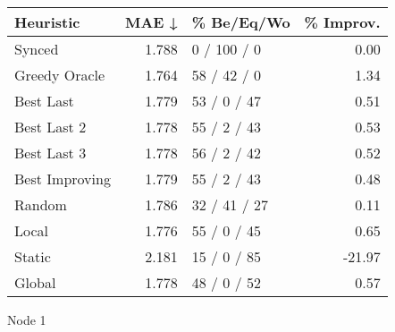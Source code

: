 \begin{tabular}{lrlr}
\toprule
\textbf{Heuristic} & \textbf{MAE ↓} & \textbf{\% Be/Eq/Wo} & \textbf{\% Improv.} \\
\midrule
            Synced &          1.788 &          0 / 100 / 0 &                0.00 \\
     Greedy Oracle &          1.764 &          58 / 42 / 0 &                1.34 \\
         Best Last &          1.779 &          53 / 0 / 47 &                0.51 \\
       Best Last 2 &          1.778 &          55 / 2 / 43 &                0.53 \\
       Best Last 3 &          1.778 &          56 / 2 / 42 &                0.52 \\
    Best Improving &          1.779 &          55 / 2 / 43 &                0.48 \\
            Random &          1.786 &         32 / 41 / 27 &                0.11 \\
             Local &          1.776 &          55 / 0 / 45 &                0.65 \\
            Static &          2.181 &          15 / 0 / 85 &              -21.97 \\
            Global &          1.778 &          48 / 0 / 52 &                0.57 \\
\bottomrule
\end{tabular}
\caption{Node 1}
\label{tab:ds_iid_lr01_le1_bs2_1}
